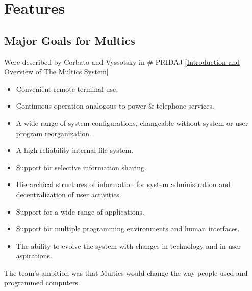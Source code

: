 \section{Features}


\subsection{Major Goals for Multics}

Were described by Corbato and Vyssotsky in # PRIDAJ \ref{Introduction and Overview of The Multics System}

\begin{itemize}
    \item Convenient remote terminal use.
    \item Continuous operation analogous to power & telephone services.
    \item A wide range of system configurations, changeable without system or user program reorganization.
    \item A high reliability internal file system.
    \item Support for selective information sharing.
    \item Hierarchical structures of information for system administration and decentralization of user activities.
    \item Support for a wide range of applications.
    \item Support for multiple programming environments and human interfaces.
    \item The ability to evolve the system with changes in technology and in user aspirations.
\end{itemize}

The team's ambition was that Multics would change the way people used and programmed computers.


